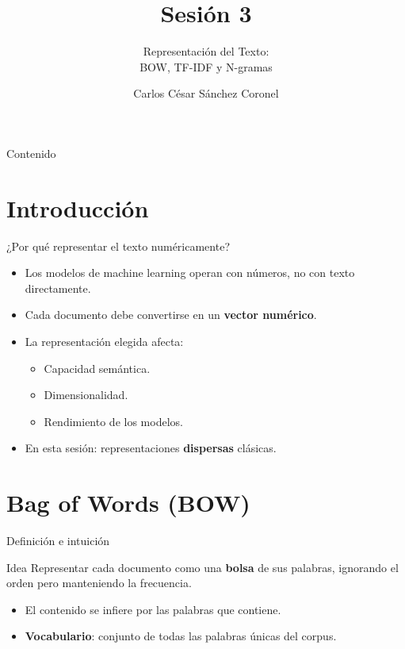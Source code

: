 \documentclass[aspectratio=169, 10pt, xcolor=table]{beamer}
\title[SESIÓN 3 NLP]{\textbf{Sesión 3}}
\subtitle{Representación del Texto: \\ BOW, TF-IDF y N-gramas}
\author[Prof. C. Sánchez]{Carlos César Sánchez Coronel}
\institute{\textbf{NLP}}
\date{}
\begin{document}
\begin{frame}
    \titlepage
\end{frame}

\begin{frame}{Contenido}
    \tableofcontents
\end{frame}

\section{Introducción}

\begin{frame}{¿Por qué representar el texto numéricamente?}
    \begin{itemize}
        \item Los modelos de machine learning operan con números, no con texto directamente.
        \item Cada documento debe convertirse en un \textbf{vector numérico}.
        \item La representación elegida afecta:
        \begin{itemize}
            \item Capacidad semántica.
            \item Dimensionalidad.
            \item Rendimiento de los modelos.
        \end{itemize}
        \item En esta sesión: representaciones \textbf{dispersas} clásicas.
    \end{itemize}
\end{frame}

\section{Bag of Words (BOW)}

\begin{frame}{Definición e intuición}
    \begin{block}{Idea}
        Representar cada documento como una \textbf{bolsa} de sus palabras, ignorando el orden pero manteniendo la frecuencia.
    \end{block}
    \begin{itemize}
        \item El contenido se infiere por las palabras que contiene.
        \item \textbf{Vocabulario}: conjunto de todas las palabras únicas del corpus.
    \end{itemize}
\end{frame}
\end{document}
